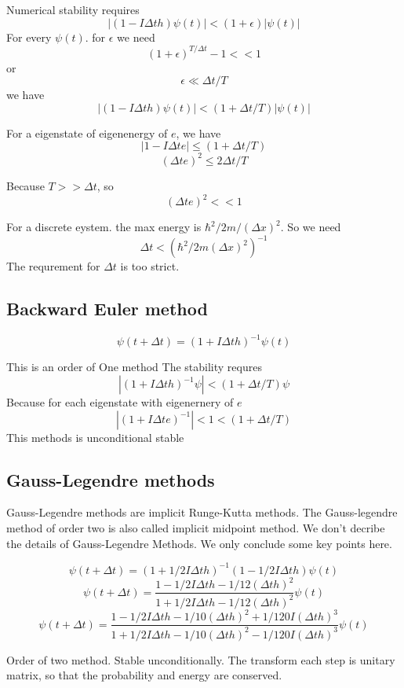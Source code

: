Numerical stability requires
$$
|(1 - I \Delta t h)\psi(t)| < (1 + \epsilon)|\psi(t)|
$$
For every $\psi(t)$. for $\epsilon$ we need
$$
(1 + \epsilon)^{T/\Delta t} - 1 << 1
$$
or
$$
\epsilon \ll \Delta t / T
$$
we have
$$
|(1 - I \Delta t h)\psi(t)| < (1 + \Delta t / T)|\psi(t)|
$$

 For a eigenstate of eigenenergy of $e$, we have
$$
| 1 - I \Delta t e| \le (1 + \Delta t / T)
$$
$$
(\Delta t e)^2 \le 2 \Delta t / T
$$

Because $T >> \Delta t$, so
$$
(\Delta t e)^2 << 1
$$

For a discrete eystem. the max energy is $\hbar^2/2m/(\Delta x)^2$. So we need
$$
\Delta t < (\hbar^2/2m(\Delta x)^2)^{-1}
$$
The requrement for $\Delta t$ is too strict.

\subsection{Backward Euler method}

$$
\psi(t + \Delta t) = (1 + I \Delta t h)^{-1} \psi(t)
$$

This is an order of One method
The stability requres
$$
|(1 + I \Delta t h)^{-1}\psi| < (1 + \Delta t / T) \psi
$$
Because for each eigenstate with eigenernery of $e$
$$
|(1 + I \Delta t e)^{-1}| < 1 < (1 + \Delta t / T)
$$
This methods is unconditional stable

\subsection{Gauss-Legendre methods}

Gauss-Legendre methods are implicit Runge-Kutta methods. The Gauss-legendre method of order two is also called implicit midpoint method.
We don't decribe the details of Gauss-Legendre Methods. We only conclude some key points here.

$$
\psi(t + \Delta t) = (1 + 1/2 I \Delta t h)^{-1} (1 - 1/2 I \Delta t h) \psi(t)
$$
$$
\psi(t + \Delta t) = \frac{1 - 1/2 I \Delta t h - 1/12 (\Delta t h)^2}{ 1 + 1/2 I \Delta t h - 1/12 (\Delta t h)^2} \psi(t)
$$
$$
\psi(t + \Delta t) = \frac{1 - 1/2 I \Delta t h - 1/10 (\Delta t h)^2 + 1/120 I (\Delta t h)^3}{ 1 + 1/2 I \Delta t h - 1/10 (\Delta t h)^2 - 1/120 I (\Delta t h)^3} \psi(t)
$$

Order of two method.
Stable unconditionally.
The transform each step is unitary matrix, so that the probability and energy are conserved.




